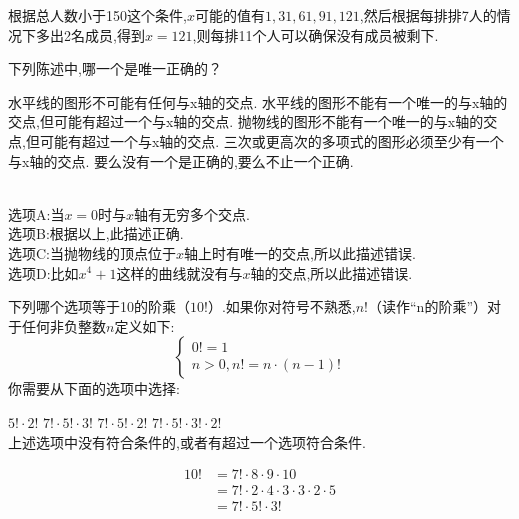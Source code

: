 \documentclass[answers]{exam}
\begin{document}
\begin{questions}
\begin{solution}
		根据总人数小于150这个条件,$x$可能的值有$1,31,61,91,121$,然后根据每排排7人的情况下多出2名成员,得到$x=121$,则每排11个人可以确保没有成员被剩下.

	\end{solution}

	\question 下列陈述中,哪一个是唯一正确的？
	\begin{choices}
		\choice 水平线的图形不可能有任何与x轴的交点.
		\CorrectChoice 水平线的图形不能有一个唯一的与x轴的交点,但可能有超过一个与x轴的交点.
		\choice 抛物线的图形不能有一个唯一的与x轴的交点,但可能有超过一个与x轴的交点.
		\choice 三次或更高次的多项式的图形必须至少有一个与x轴的交点.
		\choice 要么没有一个是正确的,要么不止一个正确.
	\end{choices}
	\begin{solution}\\
		选项A:当$x=0$时与$x$轴有无穷多个交点.\\
		选项B:根据以上,此描述正确.\\
		选项C:当抛物线的顶点位于$x$轴上时有唯一的交点,所以此描述错误.\\
		选项D:比如$x^4+1$这样的曲线就没有与$x$轴的交点,所以此描述错误.
	\end{solution}

	\question 下列哪个选项等于10的阶乘（$10!$）.如果你对符号不熟悉,$n!$（读作\enquote{n的阶乘}）对于任何非负整数$n$定义如下:
	\begin{equation*}
		\begin{cases}
			0! = 1 \\
			n > 0,n! = n \cdot (n-1)!
		\end{cases}
	\end{equation*}
	你需要从下面的选项中选择:

	\begin{oneparchoices}
		\choice $5! \cdot 2!$
		\CorrectChoice $7! \cdot 5! \cdot 3!$
		\choice $7! \cdot 5! \cdot 2!$
		\choice $7! \cdot 5! \cdot 3! \cdot 2!$ \\
		\choice 上述选项中没有符合条件的,或者有超过一个选项符合条件.
	\end{oneparchoices}

	\begin{solution}
		\begin{align*}
			10! & = 7! \cdot 8 \cdot 9 \cdot 10                        \\
			    & = 7! \cdot 2 \cdot 4 \cdot 3 \cdot 3 \cdot 2 \cdot 5 \\
			    & = 7! \cdot 5! \cdot 3!
		\end{align*}
	\end{solution}


\end{questions}
\end{document}
